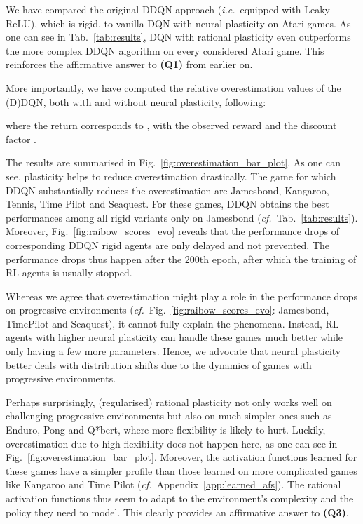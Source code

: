 \documentclass[accepted]{article}
\theoremstyle{plain}
\theoremstyle{definition}
\theoremstyle{remark}
\newcommand{\ie}{\emph{i.e.}~}
\newcommand{\cf}{\emph{cf.}~}
\begin{document}
We have compared the original DDQN approach (\ie equipped with Leaky ReLU), which is rigid, to vanilla DQN with neural plasticity on Atari games. As one can see in Tab.~\ref{tab:results},  
DQN with rational plasticity even outperforms the more complex DDQN algorithm on every considered Atari game. This reinforces the affirmative answer to \textbf{(Q1)} from earlier on. 

More importantly, we have computed the relative overestimation values of the (D)DQN, both with and without neural plasticity, following:

where the return  corresponds to , with the observed reward  and the discount factor . 

The results are summarised in Fig.~\ref{fig:overestimation_bar_plot}. 
As one can see, plasticity helps to reduce overestimation drastically. The game for which DDQN substantially reduces the overestimation are Jamesbond, Kangaroo, Tennis, Time Pilot and Seaquest. For these games, DDQN obtains the best performances among all rigid variants only on Jamesbond (\cf Tab.~\ref{tab:results}). 
Moreover, Fig.~\ref{fig:raibow_scores_evo} reveals that the performance drops of corresponding DDQN rigid agents are only delayed and not prevented. The performance drops thus happen after the 200th epoch, after which the training of RL agents is usually stopped. 

Whereas we agree that overestimation might play a role in the performance drops on progressive environments (\cf Fig.~\ref{fig:raibow_scores_evo}: Jamesbond, TimePilot and Seaquest), it cannot fully explain the phenomena.
Instead, RL agents with higher neural plasticity can handle these games much better while only having a few more parameters. Hence, we advocate that neural plasticity better deals with distribution shifts due to the dynamics of games with progressive environments. 

Perhaps surprisingly, (regularised) rational plasticity not only works well on challenging progressive environments but also on much simpler ones such as Enduro, Pong and Q*bert, where more flexibility is likely to hurt. 
Luckily, overestimation due to high flexibility does not happen here, as one can see in Fig.~\ref{fig:overestimation_bar_plot}. 
Moreover, the activation functions learned for these games have a simpler profile than those learned on more complicated games like Kangaroo and Time Pilot (\cf Appendix~\ref{app:learned_afs}). The rational activation functions thus seem to adapt to the environment's complexity and the policy they need to model. This clearly provides an affirmative answer to \textbf{(Q3)}.
\end{document}
